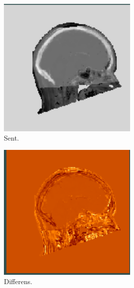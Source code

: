 \begin{figure}[H]
    \begin{subfigure}{0.3\textwidth}
        \centering
        \includegraphics[width=0.75\textwidth]{colager/over_tid_sct/over_tid_sct_140547_late.png}
        \caption{Sent.}
        \label{col:over_time_sct_pat2_late}
    \end{subfigure}\hfill
    \begin{subfigure}{0.3\textwidth}
        \centering
        \includegraphics[width=0.75\textwidth]{colager/over_tid_sct/over_tid_sct_140547_sub.png}
        \caption{Differens.}
        \label{col:over_time_sct_pat2_sub}
    \end{subfigure}\\
    \begin{subfigure}{0.3\textwidth}

\end{subfigure}
\end{figure}
